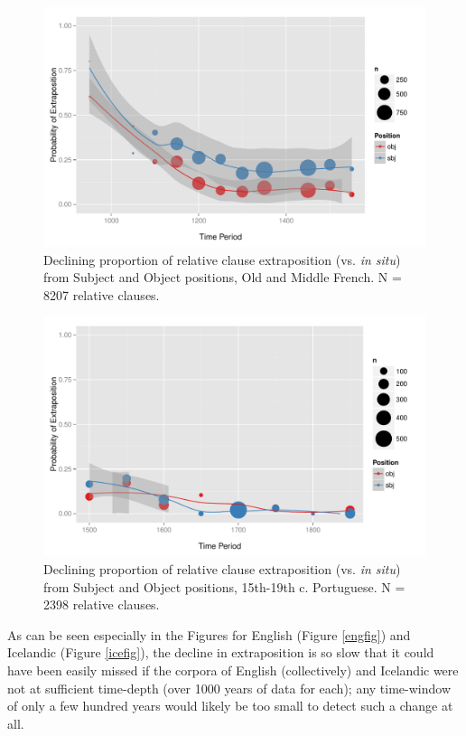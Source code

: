 \begin{figure}
  \includegraphics[width=1.1\textwidth]{stableVarTalks/exSbjObjYearBinned50Loessfre.pdf}
\caption{Declining proportion of relative clause extraposition (vs. \textsl{in situ}) from Subject and Object positions, Old and Middle French. N = 8207 relative clauses.}
\label{frefig}       
\end{figure}

\begin{figure}
  \includegraphics[width=1.1\textwidth]{stableVarTalks/exSbjObjYearBinned50Loessport.pdf}
\caption{Declining proportion of relative clause extraposition (vs. \textsl{in situ}) from Subject and Object positions, 15th-19th c. Portuguese. N = 2398 relative clauses.}
\label{frefig}       
\end{figure}



As can be seen especially in the Figures for English (Figure \ref{engfig}) and Icelandic (Figure \ref{icefig}), the decline in extraposition is so slow that it could have been easily missed if the corpora of English (collectively) and Icelandic were not at sufficient time-depth (over 1000 years of data for each); any time-window of only a few hundred years would likely be too small to detect such a change at all.

